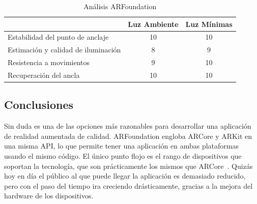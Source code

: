 \begin{table}[H]
    \centering
  \begin{tabular}{l c c}
    \toprule
          & Luz Ambiente & Luz Mínimas \\
         \midrule
        Estabilidad del punto de anclaje   &10 &10\\
        
        Estimación y calidad de iluminación  &8 &9 \\
        
        Resistencia a movimientos  &9 &10 \\
        
        Recuperación del ancla  &10 &10 \\
      \bottomrule
    \end{tabular}
    \caption{Análisis ARFoundation}
    \label{tab:ARFoundation}
\end{table}

\subsection{Conclusiones}
Sin duda es una de las opciones más razonables para desarrollar una aplicación de realidad aumentada de calidad. ARFoundation engloba ARCore y ARKit en una misma API, lo que permite tener una aplicación en ambas plataformas usando el mismo código. El único punto flojo es el rango de dispositivos que soportan la tecnología, que son prácticamente los mismos que ARCore~\cite{ARCoreList}. Quizás hoy en día el público al que puede llegar la aplicación es demasiado reducido, pero con el paso del tiempo ira creciendo drásticamente, gracias a la mejora del hardware de los dispositivos.


